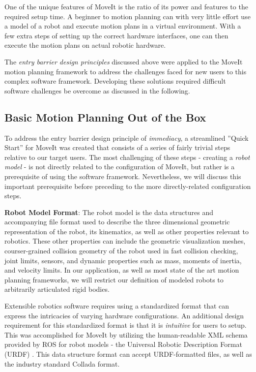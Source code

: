 \documentclass[10pt,journal,compsoc]{joser1}
\begin{document}
{One of the unique features of MoveIt is the ratio of its power and features to the required setup time. A beginner to motion planning can with very little effort use a model of a robot and execute motion plans in a virtual environment. With a few extra steps of setting up the correct hardware interfaces, one can then execute the motion plans on actual robotic hardware.

The \textit{entry barrier design principles} discussed above were applied to the MoveIt motion planning framework to address the challenges faced for new users to this complex software framework. Developing these solutions required difficult software challenges be overcome as discussed in the following.

\subsection{Basic Motion Planning Out of the Box}

To address the entry barrier design principle of \textit{immediacy}, a streamlined ''Quick Start'' for MoveIt was created that consists of a series of fairly trivial steps relative to our target users. The most challenging of these steps - creating a \textit{robot model} - is not directly related to the configuration of MoveIt, but rather is a prerequisite of using the software framework. Nevertheless, we will discuss this important prerequisite before preceding to the more directly-related configuration steps. 

{\bf Robot Model Format}: The robot model is the data structures and accompanying file format used to describe the three dimensional geometric representation of the robot, its kinematics, as well as other properties relevant to robotics. These other properties can include the geometric visualization meshes, courser-grained collision geometry of the robot used in fast collision checking, joint limits, sensors, and dynamic properties such as mass, moments of inertia, and velocity limits. In our application, as well as most state of the art motion planning frameworks, we will restrict our definition of modeled robots to arbitrarily articulated rigid bodies.

Extensible robotics software requires using a standardized format that can express the intricacies of varying hardware configurations. An additional design requirement for this standardized format is that it is \textit{intuitive} for users to setup. This was accomplished for MoveIt by utilizing the human-readable XML schema provided by ROS for robot models - the Universal Robotic Description Format (URDF) \cite{urdf}. This data structure format can accept URDF-formatted files, as well as the industry standard Collada \cite{collada} format.

}
\end{document}
